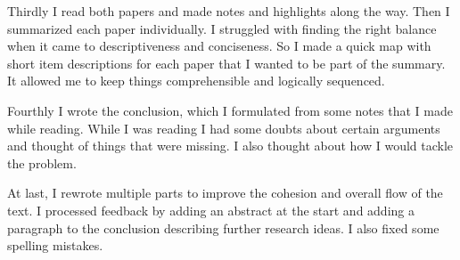 \documentclass[a4paper,12pt]{article}
\begin{document}
\begin{multicols}{2}
    Thirdly I read both papers and made notes and highlights along the way. Then I summarized each paper individually.
    I
    struggled with finding the right balance when it came to descriptiveness and conciseness. So I made a quick map
    with
    short item descriptions for each paper that I wanted to be part of the summary. It allowed me to keep things
    comprehensible and logically sequenced.

    Fourthly I wrote the conclusion, which I formulated from some notes that I made while reading. While I was reading
    I
    had some doubts about certain arguments and thought of things that were missing. I also thought about how I would
    tackle the problem.

    At last, I rewrote multiple parts to improve the cohesion and overall flow of the text. I processed feedback by
    adding an abstract at the start and adding a paragraph to the conclusion describing further research ideas. I also
    fixed some spelling mistakes.

\end{multicols}

\printbibliography
\end{document}
